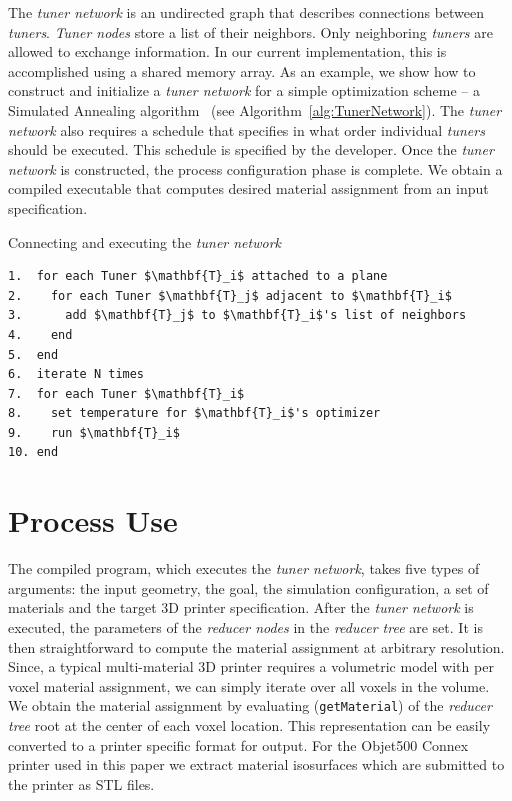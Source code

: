 The \emph{tuner network} is an undirected graph that describes connections between \emph{tuners}. \emph{Tuner nodes} store a list of their neighbors. Only neighboring \emph{tuners} are allowed to exchange information. In our current implementation, this is accomplished using a shared memory array. As an example, we show how to construct and initialize a \emph{tuner network} for a simple optimization scheme -- a Simulated Annealing algorithm~\cite{Van:1987} (see Algorithm~\ref{alg:TunerNetwork}). The \emph{tuner network} also requires a schedule that specifies in what order individual \emph{tuners} should be executed. This schedule is specified by the developer. Once the \emph{tuner network} is constructed, the process configuration phase is complete. We obtain a compiled executable that computes desired material assignment from an input specification.
\begin{algorithm}
\caption{Connecting and executing the \emph{tuner network}}
\label{alg:TunerNetwork}
\begin{lstlisting}[mathescape=true]
1.  for each Tuner $\mathbf{T}_i$ attached to a plane
2.    for each Tuner $\mathbf{T}_j$ adjacent to $\mathbf{T}_i$
3.      add $\mathbf{T}_j$ to $\mathbf{T}_i$'s list of neighbors
4.    end
5.  end
6.  iterate N times
7.  for each Tuner $\mathbf{T}_i$
8.    set temperature for $\mathbf{T}_i$'s optimizer
9.    run $\mathbf{T}_i$
10. end
\end{lstlisting}
\end{algorithm} 
\section{Process Use}
\label{sec:use}
The compiled program, which executes the \emph{tuner network}, takes five types of arguments: the input geometry, the goal, the simulation configuration, a set of materials and the target 3D printer specification. 
After the \emph{tuner network} is executed, the parameters of the \emph{reducer nodes} in the \emph{reducer tree} are set. It is then straightforward to compute the material assignment at arbitrary resolution. Since, a typical multi-material 3D printer requires a volumetric model with per voxel material assignment, we can simply iterate over all voxels in the volume. We obtain the material assignment by evaluating (\verb|getMaterial|) of the \emph{reducer tree} root at the center of each voxel location. This representation can be easily converted to a printer specific format for output. For the Objet500 Connex printer used in this paper we extract material isosurfaces which are submitted to the printer as STL files. 